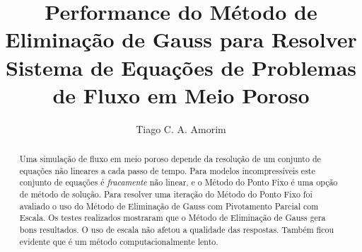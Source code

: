 \documentclass[final,5p]{elsarticle}
\numberwithin{equation}{section}
\begin{document}
\begin{frontmatter}



\title{Performance do Método de Eliminação de Gauss para Resolver Sistema de Equações de Problemas de Fluxo em Meio Poroso}


\author{Tiago C. A. Amorim}

\begin{abstract}

    Uma simulação de fluxo em meio poroso depende da resolução de um conjunto de equações não lineares a cada passo de tempo. Para modelos incompressíveis este conjunto de equações é \emph{fracamente} não linear, e o Método do Ponto Fixo é uma opção de método de solução. Para resolver uma iteração do Método do Ponto Fixo foi avaliado o uso do Método de Eliminação de Gauss com Pivotamento Parcial com Escala.
    Os testes realizados mostraram que o Método de Eliminação de Gauss gera bons resultados. O uso de escala não afetou a qualidade das respostas. Também ficou evidente que é um método computacionalmente lento.


\end{abstract}
\end{frontmatter}
\end{document}
